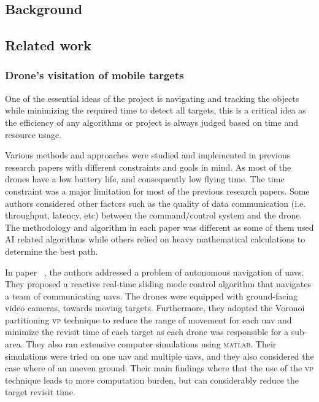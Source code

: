 \documentclass[../main.tex]{subfiles}
\begin{document}
\subsection{Background}

\blindtext

\subsection{Related work}

	\subsubsection{Drone's visitation of mobile targets}

		One of the essential ideas of the project is navigating and tracking the objects while minimizing the required time to detect all targets, this is a critical idea as the efficiency of any algorithms or project is always judged based on time and resource usage.
		
		Various methods and approaches were studied and implemented in previous research papers with different constraints and goals in mind.
		As most of the drones have a low battery life, and consequently low flying time. The time constraint was a major limitation for most of the previous research papers. 
		Some authors considered other factors such as the quality of data communication (i.e. throughput, latency, etc) between the command/control system and the drone.
		The methodology and algorithm in each paper was different as some of them used AI related algorithms while others relied on heavy mathematical calculations to determine the best path.
		
		In paper ~\cite{hua20}, the authors \citeauthor{hua20} addressed a problem of autonomous navigation of \glspl{uav}. 
		They proposed a reactive real-time sliding mode control algorithm that navigates a team of communicating \glspl{uav}.
		The drones were equipped with ground-facing video cameras, towards moving targets. 
		Furthermore, they adopted the Voronoi partitioning \textsc{vp} technique to reduce the range of movement for each \gls{uav} and minimize the revisit time of each target as each drone was responsible for a sub-area.
		They also ran extensive computer simulations using \textsc{matlab}. Their simulations were tried on one \gls{uav} and multiple \glspl{uav},
		and they also considered the case where of an uneven ground. 
		Their main findings where that the use of the \textsc{vp} technique leads to more computation burden, but can considerably reduce the target revisit time.
		
\end{document}
